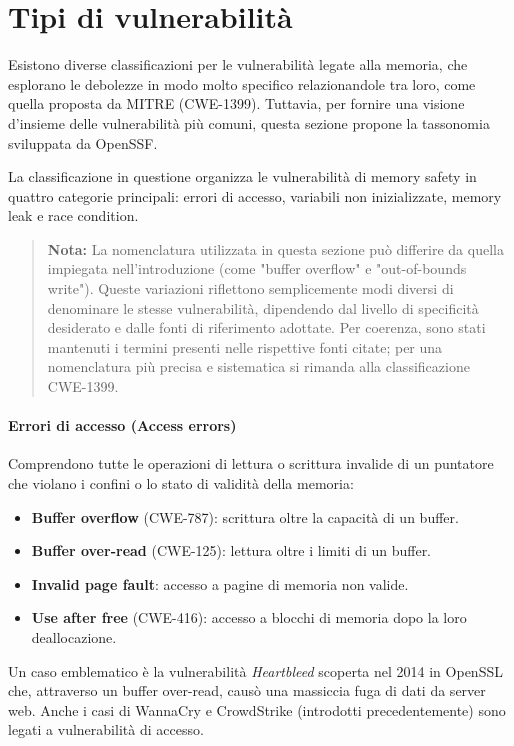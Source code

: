 \section{Tipi di vulnerabilità}
\label{sec:vulnerability_types}

Esistono diverse classificazioni per le vulnerabilità legate alla memoria, che
esplorano le debolezze in modo molto specifico relazionandole tra loro, come quella
proposta da MITRE (CWE-1399\cite{cwe_1399}). Tuttavia, per fornire una visione d'insieme
delle vulnerabilità più comuni, questa sezione propone la tassonomia sviluppata da
OpenSSF\cite{memory_safety_continuum_definition}.

La classificazione in questione organizza le vulnerabilità di memory safety in
quattro categorie principali: errori di accesso, variabili non inizializzate, memory
leak e race condition.

\begin{quote}
  \textbf{Nota:} La nomenclatura utilizzata in questa sezione può differire da
  quella impiegata nell'introduzione (come "buffer overflow" e "out-of-bounds
  write"). Queste variazioni riflettono semplicemente modi diversi di denominare
  le stesse vulnerabilità, dipendendo dal livello di specificità desiderato e
  dalle fonti di riferimento adottate. Per coerenza, sono stati mantenuti i
  termini presenti nelle rispettive fonti citate; per una nomenclatura più precisa
  e sistematica si rimanda alla classificazione CWE-1399\cite{cwe_1399}.
\end{quote}

\paragraph{Errori di accesso (Access errors)}
\label{sec:access_errors}

Comprendono tutte le operazioni di lettura o scrittura invalide di un puntatore
che violano i confini o lo stato di validità della memoria:
\begin{itemize}
  \item \textbf{Buffer overflow} (CWE-787): scrittura oltre la capacità di un buffer.

  \item \textbf{Buffer over-read} (CWE-125): lettura oltre i limiti di un buffer.

  \item \textbf{Invalid page fault}: accesso a pagine di memoria non valide.

  \item \textbf{Use after free} (CWE-416): accesso a blocchi di memoria dopo la loro
    deallocazione.
\end{itemize}
Un caso emblematico è la vulnerabilità \textit{Heartbleed}\cite{heartbleed} scoperta
nel 2014 in OpenSSL che, attraverso un buffer over-read, causò una massiccia fuga
di dati da server web. Anche i casi di WannaCry e CrowdStrike (introdotti precedentemente)
sono legati a vulnerabilità di accesso.

